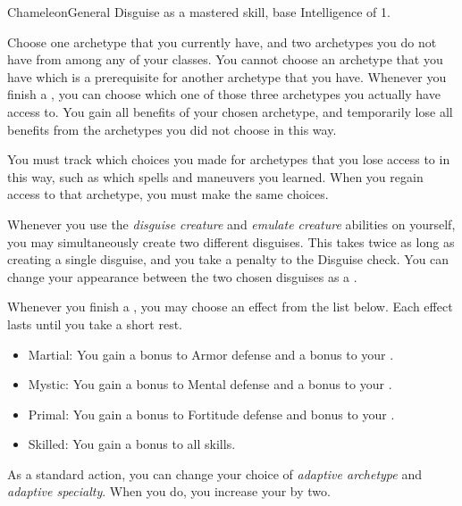     \begin{feat}{Chameleon}{General}
        \featpre Disguise as a mastered skill, base Intelligence of 1.

         Choose one archetype that you currently have, and two archetypes you do not have from among any of your classes.
        You cannot choose an archetype that you have which is a prerequisite for another archetype that you have.
        Whenever you finish a , you can choose which one of those three archetypes you actually have access to.
        You gain all benefits of your chosen archetype, and temporarily lose all benefits from the archetypes you did not choose in this way.

        You must track which choices you made for archetypes that you lose access to in this way, such as which spells and maneuvers you learned.
        When you regain access to that archetype, you must make the same choices.

         Whenever you use the \textit{disguise creature} and \textit{emulate creature} abilities on yourself, you may simultaneously create two different disguises.
        This takes twice as long as creating a single disguise, and you take a  penalty to the Disguise check.
        You can change your appearance between the two chosen disguises as a .

         Whenever you finish a , you may choose an effect from the list below.
        Each effect lasts until you take a short rest.
        \begin{itemize}
            \item Martial: You gain a  bonus to Armor defense and a  bonus to your  .
            \item Mystic: You gain a  bonus to Mental defense and a  bonus to your  .
            \item Primal: You gain a  bonus to Fortitude defense and  bonus to your .
            \item Skilled: You gain a  bonus to all skills.
        \end{itemize}

         As a standard action, you can change your choice of \textit{adaptive archetype} and \textit{adaptive specialty}.
        When you do, you increase your  by two.


\end{feat}
